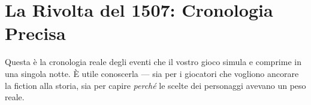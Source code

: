 \section{La Rivolta del 1507: Cronologia Precisa}
\label{sec:rivolta-cronologia}


Questa è la cronologia reale degli eventi che il vostro gioco simula
e comprime in una singola notte. È utile conoscerla — sia per i
giocatori che vogliono ancorare la fiction alla storia, sia per
capire \textit{perché} le scelte dei personaggi avevano un peso reale.

